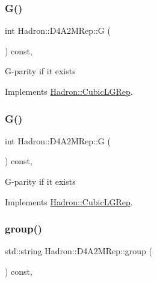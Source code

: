 \subsubsection{\texorpdfstring{G()}{G()}\hspace{0.1cm}{\footnotesize\ttfamily [2/3]}}
{\footnotesize\ttfamily int Hadron\+::\+D4\+A2\+M\+Rep\+::G (\begin{DoxyParamCaption}{ }\end{DoxyParamCaption}) const\hspace{0.3cm}{\ttfamily [inline]}, {\ttfamily [virtual]}}

G-\/parity if it exists 

Implements \mbox{\hyperlink{structHadron_1_1CubicLGRep_ace26f7b2d55e3a668a14cb9026da5231}{Hadron\+::\+Cubic\+L\+G\+Rep}}.

\mbox{\label{structHadron_1_1D4A2MRep_ae60f1ea025e472e961b4c3804a34f1e0}} 
\subsubsection{\texorpdfstring{G()}{G()}\hspace{0.1cm}{\footnotesize\ttfamily [3/3]}}
{\footnotesize\ttfamily int Hadron\+::\+D4\+A2\+M\+Rep\+::G (\begin{DoxyParamCaption}{ }\end{DoxyParamCaption}) const\hspace{0.3cm}{\ttfamily [inline]}, {\ttfamily [virtual]}}

G-\/parity if it exists 

Implements \mbox{\hyperlink{structHadron_1_1CubicLGRep_ace26f7b2d55e3a668a14cb9026da5231}{Hadron\+::\+Cubic\+L\+G\+Rep}}.

\mbox{\label{structHadron_1_1D4A2MRep_aa38e3e3ecd9017b530bc7b9a89197255}} 
\subsubsection{\texorpdfstring{group()}{group()}\hspace{0.1cm}{\footnotesize\ttfamily [1/3]}}
{\footnotesize\ttfamily std\+::string Hadron\+::\+D4\+A2\+M\+Rep\+::group (\begin{DoxyParamCaption}{ }\end{DoxyParamCaption}) const\hspace{0.3cm}{\ttfamily [inline]}, {\ttfamily [virtual]}}

